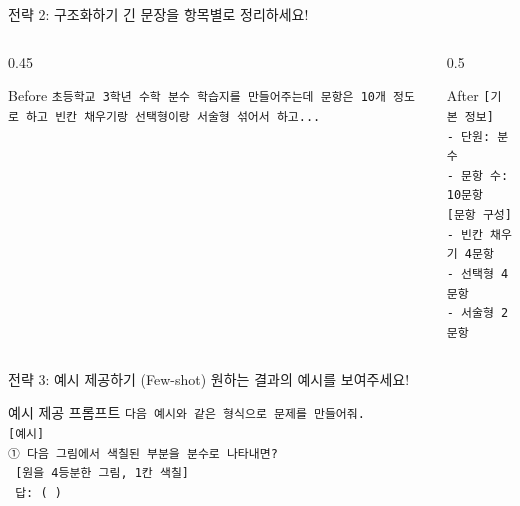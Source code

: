 \documentclass[aspectratio=169, 11pt]{beamer}
\begin{document}
\begin{frame}{전략 2: 구조화하기}
긴 문장을 항목별로 정리하세요!

\vspace{0.3cm}

\begin{columns}[T]
\begin{column}{0.45\textwidth}
\begin{alertblock}{Before}
\scriptsize
\texttt{초등학교 3학년 수학 분수 학습지를 만들어주는데 문항은 10개 정도로 하고 빈칸 채우기랑 선택형이랑 서술형 섞어서 하고...}
\end{alertblock}
\end{column}

\begin{column}{0.5\textwidth}
\begin{exampleblock}{After}
\scriptsize
\texttt{[기본 정보]}\\
\texttt{- 단원: 분수}\\
\texttt{- 문항 수: 10문항}\\
\texttt{[문항 구성]}\\
\texttt{- 빈칸 채우기 4문항}\\
\texttt{- 선택형 4문항}\\
\texttt{- 서술형 2문항}
\end{exampleblock}
\end{column}
\end{columns}
\end{frame}

\begin{frame}{전략 3: 예시 제공하기 (Few-shot)}
원하는 결과의 예시를 보여주세요!

\vspace{0.5cm}

\begin{exampleblock}{예시 제공 프롬프트}
\small
\texttt{다음 예시와 같은 형식으로 문제를 만들어줘.}\\
\vspace{0.2cm}
\texttt{[예시]}\\
\texttt{① 다음 그림에서 색칠된 부분을 분수로 나타내면?}\\
\texttt{   [원을 4등분한 그림, 1칸 색칠]}\\
\texttt{   답: (    )}
\end{exampleblock}
\end{frame}
\end{document}
